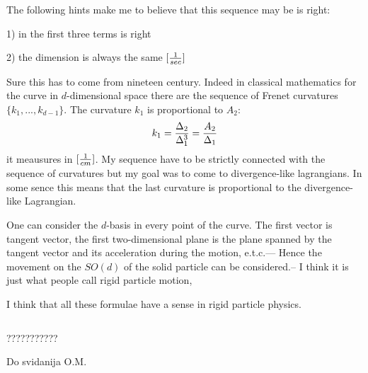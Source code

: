     The  following hints make me to believe
    that this sequence may be is right:

  1) in the first three terms  is right

  2) the dimension is always the same $[{1\over sec}]$

   \medskip

 Sure this has to come from nineteen century. Indeed in classical mathematics
 for the curve in $d$-dimensional space there are the sequence of Frenet
  curvatures $\{k_1,...,k_{d-1}\}$. The curvature $k_1$ is proportional
 to $A_2$:
               $$
    k_1={\Delta_2\over\Delta_1^3}={A_2\over\Delta_1}
                $$
  it meausures in $[{1\over cm}]$.
My sequence have to be strictly connected with the sequence
 of curvatures but my goal was to come to divergence-like
 lagrangians. In some sence this means that the last
curvature is proportional to the divergence-like Lagrangian.

  One can consider the $d$-basis in every point of the curve.
The first vector is tangent vector, the first two-dimensional plane
is the plane spanned by the tangent vector and its acceleration
during the motion, e.t.c.--- Hence the movement on the
  $SO(d)$ of the solid particle can be considered.-- I think
it is just what people call rigid particle motion,

  I think that all these formulae
      have a sense  in rigid particle physics.

$$ $$

   \centerline {???????????}


            Do svidanija O.M.
\bye
